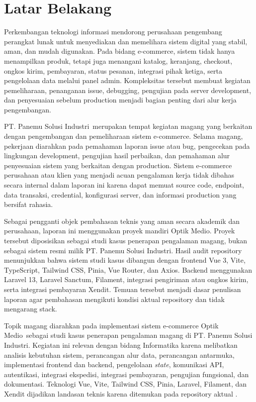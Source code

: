 \documentclass[12pt,a4paper,oneside]{report}
\newcommand{\tempatmagang}{PT. Panemu Solusi Industri}
\newcommand{\proyekstudi}{Optik Medio}
\begin{document}
\section{Latar Belakang}

Perkembangan teknologi informasi mendorong perusahaan pengembang perangkat lunak untuk menyediakan dan memelihara sistem digital yang stabil, aman, dan mudah digunakan. Pada bidang e-commerce, sistem tidak hanya menampilkan produk, tetapi juga menangani katalog, keranjang, checkout, ongkos kirim, pembayaran, status pesanan, integrasi pihak ketiga, serta pengelolaan data melalui panel admin. Kompleksitas tersebut membuat kegiatan pemeliharaan, penanganan issue, debugging, pengujian pada server development, dan penyesuaian sebelum production menjadi bagian penting dari alur kerja pengembangan.

\tempatmagang\ merupakan tempat kegiatan magang yang berkaitan dengan pengembangan dan pemeliharaan sistem e-commerce. Selama magang, pekerjaan diarahkan pada pemahaman laporan issue atau bug, pengecekan pada lingkungan development, pengujian hasil perbaikan, dan pemahaman alur penyesuaian sistem yang berkaitan dengan production. Sistem e-commerce perusahaan atau klien yang menjadi acuan pengalaman kerja tidak dibahas secara internal dalam laporan ini karena dapat memuat source code, endpoint, data transaksi, credential, konfigurasi server, dan informasi production yang bersifat rahasia.

Sebagai pengganti objek pembahasan teknis yang aman secara akademik dan perusahaan, laporan ini menggunakan proyek mandiri \proyekstudi. Proyek tersebut diposisikan sebagai studi kasus penerapan pengalaman magang, bukan sebagai sistem resmi milik \tempatmagang. Hasil audit repository menunjukkan bahwa sistem studi kasus dibangun dengan frontend Vue 3, Vite, TypeScript, Tailwind CSS, Pinia, Vue Router, dan Axios. Backend menggunakan Laravel 13, Laravel Sanctum, Filament, integrasi pengiriman atau ongkos kirim, serta integrasi pembayaran Xendit. Temuan tersebut menjadi dasar penulisan laporan agar pembahasan mengikuti kondisi aktual repository dan tidak mengarang stack.

Topik magang diarahkan pada implementasi sistem e-commerce \proyekstudi\ sebagai studi kasus penerapan pengalaman magang di \tempatmagang. Kegiatan ini relevan dengan bidang Informatika karena melibatkan analisis kebutuhan sistem, perancangan alur data, perancangan antarmuka, implementasi frontend dan backend, pengelolaan \textit{state}, komunikasi API, autentikasi, integrasi ekspedisi, integrasi pembayaran, pengujian fungsional, dan dokumentasi. Teknologi Vue, Vite, Tailwind CSS, Pinia, Laravel, Filament, dan Xendit dijadikan landasan teknis karena ditemukan pada repository aktual \cite{vue2026docs,vite2026docs,tailwind2026docs,pinia2026docs,laravel2026docs,filament2026docs,xendit2026docs}.
\end{document}
